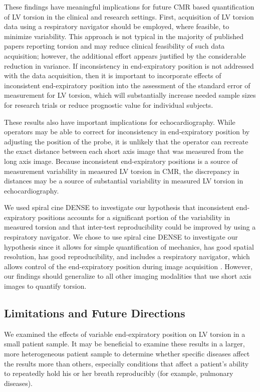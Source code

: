 	These findings have meaningful implications for future CMR based quantification of LV torsion in the clinical and research settings. First, acquisition of LV torsion data using a respiratory navigator should be employed, where feasible, to minimize variability. This approach is not typical in the majority of published papers reporting torsion and may reduce clinical feasibility of such data acquisition; however, the additional effort appears justified by the considerable reduction in variance. If inconsistency in end-expiratory position is not addressed with the data acquisition, then it is important to incorporate effects of inconsistent end-expiratory position into the assessment of the standard error of measurement for LV torsion, which will substantially increase needed sample sizes for research trials or reduce prognostic value for individual subjects.
	
	These results also have important implications for echocardiography. While operators may be able to correct for inconsistency in end-expiratory position by adjusting the position of the probe, it is unlikely that the operator can recreate the exact distance between each short axis image that was measured from the long axis image. Because inconsistent end-expiratory positions is a source of measurement variability in measured LV torsion in CMR, the discrepancy in distances may be a source of substantial variability in measured LV torsion in echocardiography.
	
	We used spiral cine DENSE to investigate our hypothesis that inconsistent end-expiratory positions accounts for a significant portion of the variability in measured torsion and that inter-test reproducibility could be improved by using a respiratory navigator. We chose to use spiral cine DENSE to investigate our hypothesis since it allows for simple quantification of mechanics, has good spatial resolution, has good reproducibility, and includes a respiratory navigator, which allows control of the end-expiratory position during image acquisition \cite{Zhong2010a,Haggerty2013,Aletras1999b,Aletras1999c}. However, our findings should generalize to all other imaging modalities that use short axis images to quantify torsion.

\subsection{Limitations and Future Directions}
	We examined the effects of variable end-expiratory position on LV torsion in a small patient sample. It may be beneficial to examine these results in a larger, more heterogeneous patient sample to determine whether specific diseases affect the results more than others, especially conditions that affect a patient's ability to repeatedly hold his or her breath reproducibly (for example, pulmonary diseases).
	
